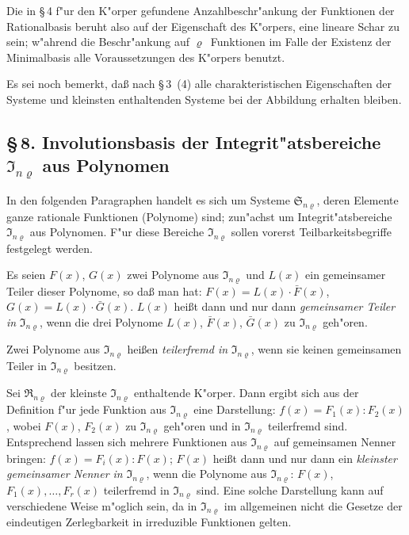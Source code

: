 \documentclass[11pt,a4paper]{article}
\begin{document}
Die in \S\,4 f"{u}r den K"{o}rper gefundene Anzahlbeschr"{a}nkung der
Funktionen der Rationalbasis beruht also auf der Eigenschaft des K"{o}rpers,
eine lineare Schar zu sein; w"{a}hrend die Beschr"{a}nkung auf $\varrho$~Funktionen im
Falle der Existenz der Minimalbasis alle Voraussetzungen des K"{o}rpers
benutzt.

Es sei noch bemerkt, da\ss{} nach \S\,3~(4) alle charakteristischen
Eigenschaften der Systeme und kleinsten enthaltenden Systeme bei der
Abbildung erhalten bleiben.

\subsection*{\S\,8. Involutionsbasis der Integrit"{a}tsbereiche $\mathfrak{I}_{n\varrho}$ aus Polynomen}

In den folgenden Paragraphen handelt es sich um Systeme $\mathfrak{S}_{n\varrho}$, deren
Elemente ganze rationale Funktionen (Polynome) sind; zun"{a}chst um
Integrit"{a}tsbereiche $\mathfrak{I}_{n\varrho}$ aus Polynomen. F"{u}r diese Bereiche $\mathfrak{I}_{n\varrho}$ sollen vorerst
Teilbarkeitsbegriffe festgelegt werden.

Es seien $F(x)$, $G(x)$ zwei Polynome aus $\mathfrak{I}_{n\varrho}$ und $L(x)$ ein gemeinsamer
Teiler dieser Polynome, so da\ss{} man hat:
$F(x)=L(x)\cdot\bar{F}(x)$, $G(x)=L(x)\cdot\bar{G}(x)$.
$L(x)$ hei\ss{}t dann und nur dann \emph{gemeinsamer Teiler in} $\mathfrak{I}_{n\varrho}$, wenn die drei
Polynome $L(x)$, $\bar{F}(x)$, $\bar{G}(x)$ zu $\mathfrak{I}_{n\varrho}$ geh"{o}ren.

Zwei Polynome aus $\mathfrak{I}_{n\varrho}$ hei\ss{}en \emph{teilerfremd in} $\mathfrak{I}_{n\varrho}$, wenn sie keinen
gemeinsamen Teiler in $\mathfrak{I}_{n\varrho}$ besitzen.

Sei $\mathfrak{R}_{n\varrho}$ der kleinste $\mathfrak{I}_{n\varrho}$ enthaltende K"{o}rper. Dann ergibt sich aus
der Definition f"{u}r jede Funktion aus $\mathfrak{I}_{n\varrho}$ eine Darstellung:
$f(x)=F_{1}(x):F_{2}(x)$,
wobei $F(x)$, $F_{2}(x)$ zu $\mathfrak{I}_{n\varrho}$ geh"{o}ren und in $\mathfrak{I}_{n\varrho}$ teilerfremd sind. Entsprechend
lassen sich mehrere Funktionen aus $\mathfrak{I}_{n\varrho}$ auf gemeinsamen Nenner bringen:
$f(x)=F_{i}(x):F(x)$;
$F(x)$ hei\ss{}t dann und nur dann ein \emph{kleinster gemeinsamer Nenner in}
$\mathfrak{I}_{n\varrho}$, wenn die Polynome aus $\mathfrak{I}_{n\varrho}$: $F(x)$, $F_{1}(x),\dots,F_{r}(x)$ teilerfremd in
$\mathfrak{I}_{n\varrho}$ sind. Eine solche Darstellung kann auf verschiedene Weise m"{o}glich sein,
da in $\mathfrak{I}_{n\varrho}$ im allgemeinen nicht die Gesetze der eindeutigen Zerlegbarkeit
in irreduzible Funktionen gelten.
\end{document}
